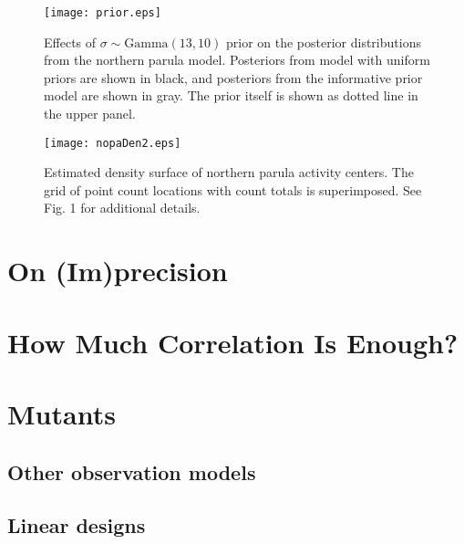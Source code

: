 
\begin{figure}
  \centering
  \texttt{[image: prior.eps]} %
  \caption{Effects of $\sigma \sim \mbox{Gamma}(13,10)$
    prior on the posterior distributions from the northern parula
    model. Posteriors from model with uniform priors are
    shown in black, and posteriors from the informative prior model
    are shown in gray. The prior itself is shown as dotted line in the
    upper panel.}
  \label{fig:prior}
\end{figure}




\begin{figure}
  \centering
  \texttt{[image: nopaDen2.eps]}
  \caption{Estimated density surface of northern parula activity
    centers. The grid of point count locations with count totals is
    superimposed. See Fig. 1 for additional details.  }
  \label{fig:nopaDen}
\end{figure}




\section{On (Im)precision}





\section{How Much Correlation Is Enough?}



\section{Mutants}

\subsection{Other observation models}

\subsection{Linear designs}




